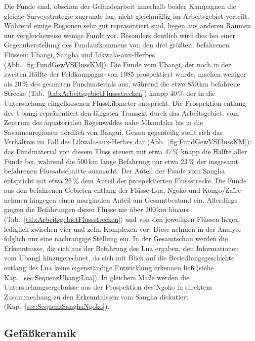 \begin{multicols}{2}
Die Funde sind, obschon der Geländearbeit innerhalb beider Kampagnen die gleiche Surveystrategie zugrunde lag, nicht gleichmäßig im Arbeitsgebiet verteilt. Während einige Regionen sehr gut repräsentiert sind, liegen aus anderen Räumen nur vergleichsweise wenige Funde vor. Besonders deutlich wird dies bei einer Gegenüberstellung des Fundaufkommens von den drei größten, befahrenen Flüssen: \mbox{Ubangi}, \mbox{Sangha} und \mbox{Likwala}-\mbox{aux}-\mbox{Herbes} (Abb.~\ref{fig:FundGewVSFlussKM}). Die Funde vom \mbox{Ubangi}, der noch in der zweiten Hälfte der Feldkampagne von 1985 prospektiert wurde, machen weniger als 20\,\% des gesamten Fundmaterials aus, während die etwa 850\,km befahrene Strecke (Tab.~\ref{tab:ArbeitsgebietFlussstrecken}) knapp 40\,\% der in die Untersuchung eingeflossenen Flusskilometer entspricht. Die Prospektion entlang des \mbox{Ubangi} repräsentiert den längsten Transekt durch das Arbeitsgebiet, vom Zentrum des äquatorialen Regenwaldes nahe Mbandaka bis in die Savannenregionen nördlich von Bangui. Genau gegenteilig stellt sich das Verhältnis im Fall des \mbox{Likwala}-\mbox{aux}-\mbox{Herbes} dar (Abb.~\ref{fig:FundGewVSFlussKM}): das Fundmaterial von diesem Fluss steuert mit etwa 47\,\% knapp die Hälfte aller Funde bei, während die 500\,km lange Befahrung nur etwa 23\,\% der insgesamt befahrenen Flussabschnitte ausmacht. Der Anteil der Funde vom \mbox{Sangha} entspricht mit etwa 25\,\% dem Anteil der prospektierten Flussstrecke. Die Funde aus den befahrenen Gebieten entlang der Flüsse Lua, \mbox{Ngoko} und Kongo/Zaïre nehmen hingegen einen marginalen Anteil am Gesamtbestand ein. Allerdings gingen die Befahrungen dieser Flüsse nie über 100\,km hinaus (Tab.~\ref{tab:ArbeitsgebietFlussstrecken}) und von den jeweiligen Flüssen liegen lediglich zwischen vier und zehn Komplexen vor. Diese nehmen in der Analyse folglich nur eine nachrangige Stellung ein. In der Gesamtschau werden die Erkenntnisse, die sich aus der Befahrung des Lua ergaben, den Informationen vom \mbox{Ubangi} hinzugerechnet, da sich mit Blick auf die Besiedlungsgeschichte entlang des Lua keine eigenständige Entwicklung erkennen ließ (siehe Kap.~\ref{sec:SequenzUbangiLua}). In gleichem Maße werden die Untersuchungsergebnisse aus der Prospektion des \mbox{Ngoko} in direktem Zusammenhang zu den Erkenntnissen vom \mbox{Sangha} diskutiert (Kap.~\ref{sec:SequenzSanghaNgoko}).


\subsection{Gefäßkeramik}\label{sec:GefKeramik}


\end{multicols}
